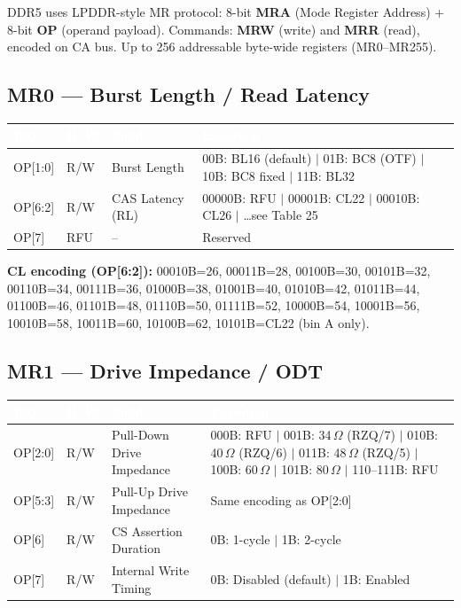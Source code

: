 \documentclass[10pt,a4paper,twoside]{article}
\newcommand{\thd}[1]{\cellcolor{navyblue}\textcolor{white}{\textbf{#1}}}
\newcommand{\trow}{\rowcolor{lightgray}}
\newcommand{\talt}{\rowcolor{skyblue!30}}
\begin{document}
DDR5 uses LPDDR-style MR protocol: 8-bit \textbf{MRA} (Mode Register Address) + 8-bit \textbf{OP} (operand payload).
Commands: \textbf{MRW} (write) and \textbf{MRR} (read), encoded on CA bus.
Up to 256 addressable byte-wide registers (MR0--MR255).

\subsection{MR0 --- Burst Length / Read Latency}

\begin{center}
\begin{tabularx}{\linewidth}{@{} l l l X @{}}
\toprule
\thd{Bits} & \thd{R/W} & \thd{Field} & \thd{Encoding} \\
\midrule
\trow OP[1:0] & R/W & Burst Length &
  00B: BL16 (default) $|$ 01B: BC8 (OTF) $|$ 10B: BC8 fixed $|$ 11B: BL32 \\
\talt OP[6:2] & R/W & CAS Latency (RL) &
  00000B: RFU $|$ 00001B: CL22 $|$ 00010B: CL26 $|$ \ldots see Table 25 \\
\trow OP[7] & RFU & -- & Reserved \\
\bottomrule
\end{tabularx}
\end{center}

\textbf{CL encoding (OP[6:2]):} 00010B=26, 00011B=28, 00100B=30, 00101B=32, 00110B=34, 00111B=36,
01000B=38, 01001B=40, 01010B=42, 01011B=44, 01100B=46, 01101B=48, 01110B=50, 01111B=52,
10000B=54, 10001B=56, 10010B=58, 10011B=60, 10100B=62, 10101B=CL22 (bin A only).

\subsection{MR1 --- Drive Impedance / ODT}

\begin{center}
\begin{tabularx}{\linewidth}{@{} l l l X @{}}
\toprule
\thd{Bits} & \thd{R/W} & \thd{Field} & \thd{Encoding} \\
\midrule
\trow OP[2:0] & R/W & Pull-Down Drive Impedance &
  000B: RFU $|$ 001B: 34\,$\Omega$ (RZQ/7) $|$ 010B: 40\,$\Omega$ (RZQ/6) $|$
  011B: 48\,$\Omega$ (RZQ/5) $|$ 100B: 60\,$\Omega$ $|$ 101B: 80\,$\Omega$ $|$ 110--111B: RFU \\
\talt OP[5:3] & R/W & Pull-Up Drive Impedance & Same encoding as OP[2:0] \\
\trow OP[6] & R/W & CS Assertion Duration &
  0B: 1-cycle $|$ 1B: 2-cycle \\
\talt OP[7] & R/W & Internal Write Timing &
  0B: Disabled (default) $|$ 1B: Enabled \\
\bottomrule
\end{tabularx}
\end{center}
\end{document}
